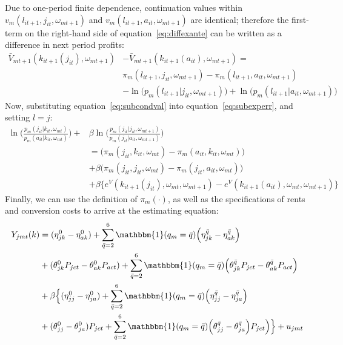 \documentclass[11pt]{article}
\begin{document}
Due to one-period finite dependence, continuation values within $v_m(l_{it+1},j_{it},\omega_{mt+1})$ and $v_m(l_{it+1},a_{it},\omega_{mt+1})$ are identical; therefore the first-term on the right-hand side of equation~\ref{eq:diffexante} can be written as a difference in next period profits:
\begin{align}  \label{eq:subcondval}
\bar{V}_{mt+1}(k_{it+1}(j_{it}),\omega_{mt+1})& -  \bar{V}_{mt+1}(k_{it+1}(a_{it}),\omega_{mt+1}) = \\ \nonumber
& \pi_m(l_{it+1},j_{it},\omega_{mt+1}) - \pi_m(l_{it+1},a_{it},\omega_{mt+1})\\ 
& - \ln\big(p_m(l_{it+1}|j_{it},\omega_{mt+1})\big) + \ln\big(p_m(l_{it+1}|a_{it},\omega_{mt+1})\big) \nonumber
\end{align}
Now, substituting equation~\ref{eq:subcondval} into equation~\ref{eq:subexperr}, and setting $l = j$:
\begin{align} 
\ln\bigg(\frac{p_m(j_{it}|k_{it},\omega_{mt})}{p_m(a_{it}|k_{it},\omega_{mt})}\bigg) + & \beta\ln\bigg(\frac{p_m(j_{it}|j_{it},\omega_{mt+1})}{p_m(j_{it}|a_{it},\omega_{mt+1})}\bigg) \\
 &=\big(\pi_m(j_{it},k_{it},\omega_{mt}) - \pi_m(a_{it},k_{it},\omega_{mt})\big)  \nonumber \\
	& + \beta \big(\pi_m(j_{it},j_{it},\omega_{mt}) - \pi_m(j_{it},a_{it},\omega_{mt})\big) \nonumber \\ 
	& + \beta \Big\{e^V(k_{it+1}(j_{it}),\omega_{mt},\omega_{mt+1}) -  e^V(k_{it+1}(a_{it}),\omega_{mt},\omega_{mt+1})\Big\} \nonumber
\end{align}
Finally, we can use the definition of $\pi_m(\cdot)$, as well as the specifications of rents and conversion costs to arrive at the estimating equation:
\begin{align}
Y_{jmt}(k) &= (\eta^0_{jk} - \eta^0_{ak}) + \sum_{\bar{q} = 2}^6 \mathbbm{1}(q_{m} = \bar{q}) \Big(\eta^{\bar{q}}_{jk} - \eta^{\bar{q}}_{ak} \Big) \\
	& + (\theta^0_{jk} P_{jct} - \theta^0_{ak} P_{act}) + \sum_{\bar{q} = 2}^6 \mathbbm{1}(q_{m} = \bar{q}) \Big(\theta^{\bar{q}}_{jk}P_{jct} - \theta^{\bar{q}}_{ak} P_{act}\Big) \nonumber \\ \nonumber
	& + \beta \Big\{(\eta^0_{jj} - \eta^0_{ja}) + \sum_{\bar{q} = 2}^6 \mathbbm{1}(q_{m} = \bar{q}) \Big(\eta^{\bar{q}}_{jj} - \eta^{\bar{q}}_{ja} \Big) \\ \nonumber
	& + (\theta^0_{jj} - \theta^0_{ja}) P_{jct} + \sum_{\bar{q} = 2}^6 \mathbbm{1}(q_{m} = \bar{q}) \Big(\theta^{\bar{q}}_{jj} - \theta^{\bar{q}}_{ja}\Big) P_{jct}\Big)\Big\} + u_{jmt} \nonumber
\end{align}
\end{document}
